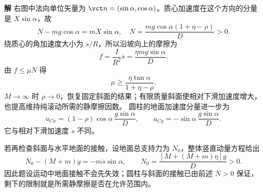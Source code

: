 \documentclass[11pt,openany,fontset=fandol]{ctexbook}
\theoremstyle{definition}\newtheorem{example}{例}[chapter]\newtheorem{exercise}{习题}[chapter]
\newcommand{\SolutionStart}{\par\medskip\ifdim\pagetotal>0pt\ifdim\dimexpr\pagegoal-\pagetotal\relax<3\baselineskip\newpage\fi\fi\noindent\textbf{解}\quad\ignorespaces}
\newenvironment{solution}{\SolutionStart}{\par\medskip}
\begin{document}
\begin{solution}
右图中法向单位矢量为 $\vct n=(\sin\alpha,\cos\alpha)$。质心加速度在这个方向的分量是 $\ddot X\sin\alpha$，故
\[
N-mg\cos\alpha=m\ddot X\sin\alpha,
\quad
N=\frac{mg\cos\alpha(1+\eta-\rho)}D>0.
\]
绕质心的角加速度大小为 $\ddot s/R$，所以沿坡向上的摩擦为
\[
f=\frac I{R^2}\ddot s=\frac{\eta mg\sin\alpha}{D}.
\]
由 $f\le\mu N$ 得
\[
\boxed{\mu\ge\frac{\eta\tan\alpha}{1+\eta-\rho}.}
\]
$M\to\infty$ 时 $\rho\to0$，恢复固定斜面的结果；有限质量斜面使相对下滑加速度增大，也提高维持纯滚动所需的静摩擦因数。
圆柱的地面加速度分量进一步为
\[
a_{Cx}=(1-\rho)\cos\alpha\,\frac{g\sin\alpha}{D},\qquad
a_{Cy}=-\sin\alpha\,\frac{g\sin\alpha}{D}.
\]
它与相对下滑加速度 $\ddot s$ 不同。

若再检查斜面与水平地面的接触，设地面总支持力为 $N_0$，整体竖直动量方程给出
\[
N_0-(M+m)g=-m\ddot s\sin\alpha,
\qquad
N_0=\frac{[M+(M+m)\eta]g}{D}>0.
\]
因此题设运动中地面接触不会先失效；圆柱与斜面的接触已由前述 $N>0$ 保证，剩下的限制就是所需静摩擦是否在允许范围内。

\end{solution}
\end{document}
